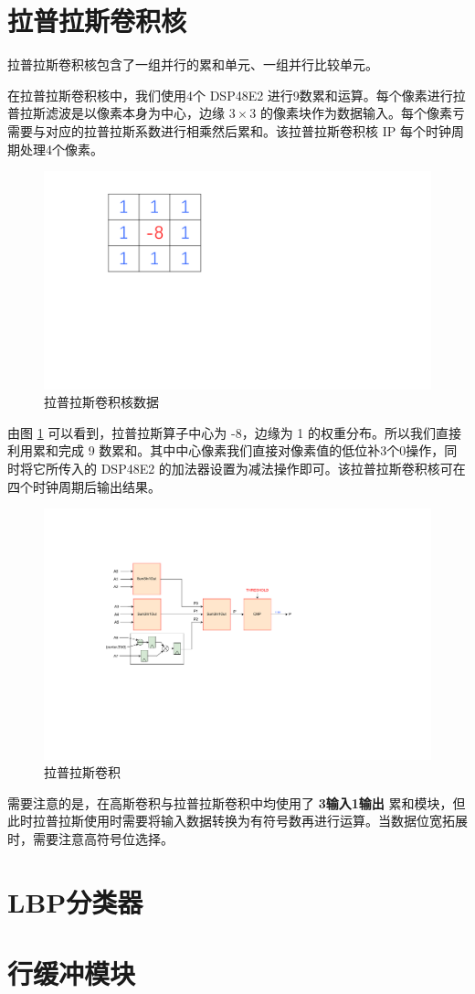 \documentclass[12pt, a4paper, oneside]{ctexbook}
\begin{document}
	\section{拉普拉斯卷积核}
	拉普拉斯卷积核包含了一组并行的累和单元、一组并行比较单元。\par
	在拉普拉斯卷积核中，我们使用4个 DSP48E2 进行9数累和运算。每个像素进行拉普拉斯滤波是以像素本身为中心，边缘 $3\times3$ 的像素块作为数据输入。每个像素亏需要与对应的拉普拉斯系数进行相乘然后累和。该拉普拉斯卷积核 IP 每个时钟周期处理4个像素。\par
	\begin{figure}[h]
		\centering
		\includegraphics[scale=0.4]{pic/number_3}
		\caption{拉普拉斯卷积核数据}
		\label{fig:number3}
	\end{figure}
	由图 \ref{fig:number3} 可以看到，拉普拉斯算子中心为 -8，边缘为 1 的权重分布。所以我们直接利用累和完成 9 数累和。其中中心像素我们直接对像素值的低位补3个0操作，同时将它所传入的 DSP48E2 的加法器设置为减法操作即可。该拉普拉斯卷积核可在四个时钟周期后输出结果。\par
	\begin{figure}[h]	
	\centering
	\includegraphics[scale=0.7]{pic/laplace.pdf}
	\caption{拉普拉斯卷积}
	\label{laplace}
	\end{figure}	
	需要注意的是，在高斯卷积与拉普拉斯卷积中均使用了 \textbf{3输入1输出} 累和模块，但此时拉普拉斯使用时需要将输入数据转换为有符号数再进行运算。当数据位宽拓展时，需要注意高符号位选择。
	
	\section{LBP分类器}
	\section{行缓冲模块}

	
	
\end{document}
